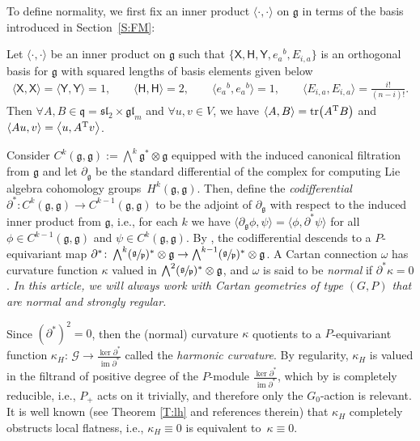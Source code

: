 \documentclass[pdftex]{sigma}%
\newcommand\tensor{\otimes}
\DeclareMathOperator{\img}{im}
\DeclareMathOperator{\tr}{tr}
\newcommand{\g}{\mathfrak{g}}
\newcommand{\gl}{\mathfrak{gl}}
\newcommand\cG{\mathcal{G}}
\newcommand\fp{\mathfrak{p}}
\newcommand\fsl{\mathfrak{sl}}
\newcommand\fq {\mathfrak{q}}
\newcommand\sfX{\mathsf{X}}
\newcommand\sfH{\mathsf{H}}
\newcommand\sfY{\mathsf{Y}}
\numberwithin{equation}{section}
\begin{document}
To define normality, we first fix an inner product $\langle \cdot, \cdot \rangle$ on $\g$ in terms of the basis introduced in Section~\ref{S:FM}:

\begin{Definition}\label{D:metric}
Let $\langle \cdot, \cdot \rangle$ be an inner product on $\g$ such that $\bigl\{\sfX, \sfH, \sfY,e_a{}^b, E_{i,a}\bigr\}$ is an orthogonal basis for $\g$ with squared lengths of basis elements given below
\begin{align*}
\langle \sfX , \sfX \rangle = \langle \sfY, \sfY \rangle = 1, \qquad \langle \sfH, \sfH \rangle = 2, \qquad
\big\langle e_a{}^b, e_a{}^b \big\rangle = 1, \qquad \langle E_{i,a}, E_{i,a} \rangle = \frac{i!}{(n-i)!}.
\end{align*}
Then $\forall A, B \in \fq= \fsl_2 \times \gl_m$ and $\forall u, v \in V$, we have $\langle A, B \rangle = \tr\bigl(A^{\rm T}B\bigr)$ and
$\langle Au , v \rangle = \big\langle u, A^{\rm T}v \big\rangle$.
\end{Definition}

Consider $C^k(\g,\g) :=\bigwedge^k\g^{\ast} \tensor \g$ equipped with the induced canonical filtration from $\g$ and let $\partial_\g$ be the standard differential of the complex for computing Lie algebra cohomology groups~$H^k\!(\g,\!\g)$. Then, define the {\em codifferential} $\partial^\ast\colon C^k(\g, \g) \to C^{k-1}(\g, \g)$ to be the adjoint of $\partial_\g$ with respect to the induced inner product from $\g$, i.e., for each $k$ we have
$\langle \partial_\g \phi , \psi \rangle = \langle \phi, \partial^\ast \psi \rangle$ for all $\phi \in C^{k-1}(\g,\g) $ and $\psi \in C^k(\g,\g)$. By \cite[Lemma~3.2]{CDT2020}, the codifferential descends to a $P$-equivariant map $\partial^\ast\colon \bigwedge^k(\sfrac{\g}{\fp})^\ast \tensor\g \to \bigwedge^{k-1}(\sfrac{\g}{\fp})^\ast \tensor\g$. A Cartan connection $\omega$ has curvature function $\kappa$ valued in $\bigwedge^2 (\sfrac{\g}{\fp})^* \otimes \g$, and $\omega$ is said to be {\em normal} if $\partial^{\ast}\kappa = 0$. {\em In this article, we will always work with Cartan geometries of type $(G,P)$ that are normal and strongly regular.}


Since $(\partial^\ast)^2 = 0$, then the (normal) curvature $\kappa$ quotients to a $P$-equivariant func\-tion $\kappa_H$: $\cG \to \frac{\ker\partial^{\ast}}{\img \partial^{\ast}}$ called the {\em harmonic curvature}. By regularity, $\kappa_H$ is valued in the filtrand of positive degree of the $P$-module $\frac{\ker\partial^{\ast}}{\img \partial^{\ast}}$, which by \cite[Corollary~3.8]{CDT2020} is completely reducible, i.e., $P_+$ acts on it trivially, and therefore only the $G_0$-action is relevant. It is well known (see Theorem \ref{T:lh} and references therein) that $\kappa_H$ completely obstructs local flatness, i.e., $\kappa_H \equiv 0$ is equivalent to~$\kappa \equiv 0$.
\end{document}
